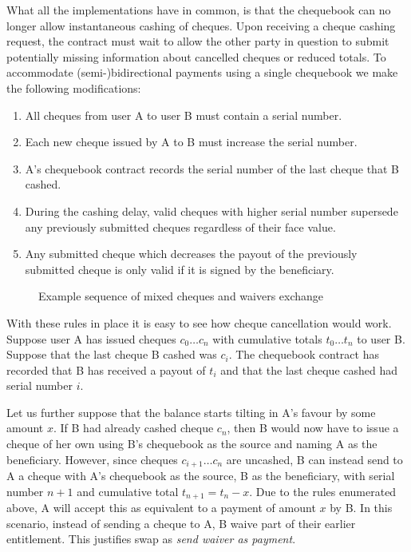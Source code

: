 What all the implementations have in common, is that the chequebook can no longer allow instantaneous cashing of cheques. Upon receiving a cheque cashing request, the contract must wait to allow the other party in question to submit potentially missing information about cancelled cheques or reduced totals. To accommodate (semi-)bidirectional payments using a single chequebook we make the following modifications:

\begin{enumerate}
    \item All cheques from user A to user B must contain a serial number.
    \item Each new cheque issued by A to B must increase the serial number.
    \item A's chequebook contract records the serial number of the last cheque that B cashed.
    \item During the cashing delay, valid cheques with higher serial number supersede any previously submitted cheques regardless of their face value.
    \item Any submitted cheque which decreases the payout of the previously submitted cheque is only valid if it is signed by the beneficiary.
\end{enumerate}


\begin{figure}[htbp]
\centering

\caption[Example sequence of mixed cheques and waivers exchange]{Example sequence of mixed cheques and waivers exchange}
\label{fig:waivers-diagram}
\end{figure}

With these rules in place it is easy to see how cheque cancellation would work. Suppose user A has issued cheques $c_0 \ldots c_n$ with cumulative totals $t_0 \ldots t_n$ to user B. Suppose that the last cheque B cashed was $c_i$. The chequebook contract has recorded that B has received a payout of $t_i$ and that the last cheque cashed had serial number $i$.

Let us further suppose that the balance starts tilting in A's favour by some amount $x$. If B had already cashed cheque $c_n$, then B would now have to issue a cheque of her own using B's chequebook as the source and naming A as the beneficiary. However, since cheques $c_{i+1} \ldots c_n$  are uncashed, B can instead send to A a cheque with A's chequebook as the source, B as the beneficiary, with serial number $n+1$ and cumulative total $t_{n+1} = t_n - x$. Due to the rules enumerated above, A will accept this as equivalent to a payment of amount $x$ by B.  In this scenario, instead of sending a cheque to A, B waive part of their earlier entitlement. This justifies swap as \emph{send waiver as payment}.

